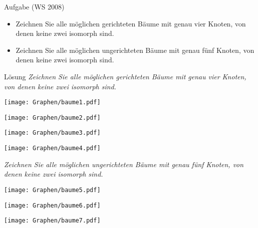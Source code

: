 \begin{frame}{Aufgabe (WS 2008)}
	\begin{itemize}	
		\item Zeichnen Sie alle möglichen gerichteten Bäume mit genau vier Knoten, von denen keine zwei isomorph sind.
		\item Zeichnen Sie alle möglichen ungerichteten Bäume mit genau fünf Knoten, von denen keine zwei isomorph sind.
	\end{itemize}
\end{frame}

\begin{frame}{Lösung}
	\textit{Zeichnen Sie alle möglichen gerichteten Bäume mit genau vier Knoten, von denen keine zwei isomorph sind.} \pause
	\begin{center}
		\begin{minipage}{0.3\linewidth}
			\vspace*{\fill}
			\centering
			\texttt{[image: Graphen/baume1.pdf]} 
			\vfill
		\end{minipage}
		\begin{minipage}{0.2\linewidth}
			\vspace*{\fill}
			\centering
			\texttt{[image: Graphen/baume2.pdf]} 
			\vfill
		\end{minipage}
		\begin{minipage}{0.2\linewidth}
			\vspace*{\fill}
			\centering
			\texttt{[image: Graphen/baume3.pdf]} 
			\vfill
		\end{minipage}
		\begin{minipage}{0.2\linewidth}
			\vspace*{\fill}
			\centering
			\texttt{[image: Graphen/baume4.pdf]} 
			\vfill
		\end{minipage}
	\end{center} \pause
	\textit{Zeichnen Sie alle möglichen ungerichteten Bäume mit genau fünf Knoten, von denen keine zwei isomorph sind.} \pause
	\begin{center}
		\begin{minipage}{0.2\linewidth}
			\vspace*{\fill}
			\centering
			\texttt{[image: Graphen/baume5.pdf]} 
			\vfill
		\end{minipage}
		\begin{minipage}{0.25\linewidth}
			\vspace*{\fill}
			\centering
			\texttt{[image: Graphen/baume6.pdf]} 
			\vfill
		\end{minipage}
		\begin{minipage}{0.35\linewidth}
			\vspace*{\fill}
			\centering
			\texttt{[image: Graphen/baume7.pdf]} 
			\vfill
		\end{minipage}
	\end{center}
\end{frame}


